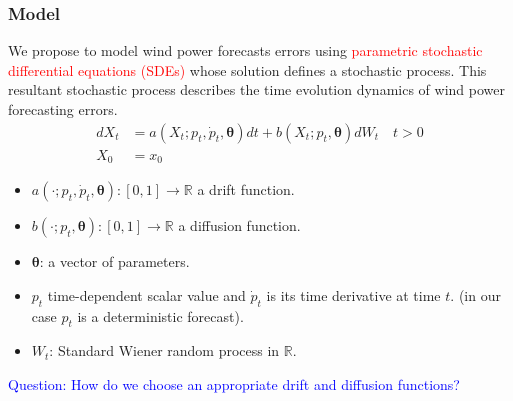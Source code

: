 \documentclass[aspectratio=169]{beamer}\usepackage[utf8]{inputenc}
\newcommand{\R}{\mathbb{R}}
\begin{document}
\begin{frame}\frametitle{Model}
We propose to model wind power forecasts errors using \textcolor{red}{parametric stochastic differential equations (SDEs)} whose solution defines a stochastic process. This resultant stochastic process describes the time evolution dynamics of wind power forecasting errors.
\begin{equation}
\begin{split}
dX_t &= a(X_t; p_t, \dot{p}_t,\bm{\theta}) dt + b (X_t;p_t, \bm{\theta} ) dW_t \quad t > 0 \\
X_0 & = x_0
\end{split}
\label{main}
\end{equation}

\begin{itemize}
\item $a(\cdot; p_t, \dot{p}_t,\bm{\theta}):[0,1] \to \R $  a drift function.
\item $b (\cdot;p_t, \bm{\theta} ):[0,1] \to \R$  a  diffusion function.
\item $\bm{\theta}$: a vector of parameters.
\item $p_t$ time-dependent scalar value and $ \dot{p}_t$ is its time derivative at time $t$. (in our case  $p_t$ is a deterministic forecast).
\item $W_t$: Standard Wiener random process in $\R$.
\end{itemize}

\textcolor{blue}{Question: How do we choose an appropriate drift and diffusion functions?}

\end{frame}
\end{document}
